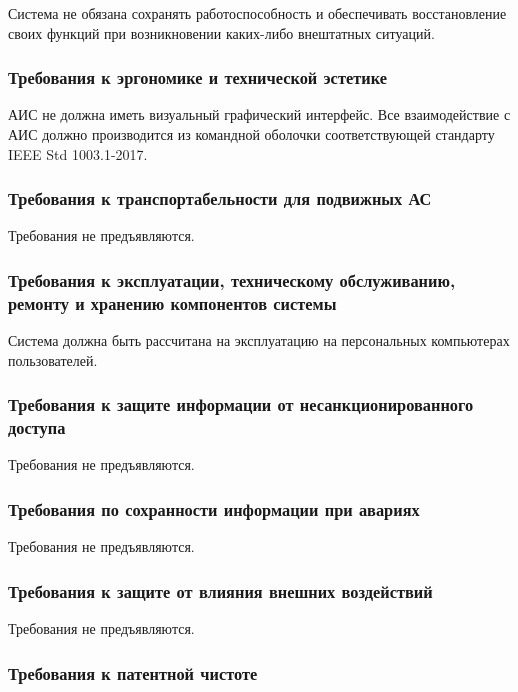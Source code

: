 \documentclass[14pt,russian]{extarticle}
\begin{document}
Система не обязана сохранять работоспособность и обеспечивать восстановление
своих функций при возникновении каких-либо внештатных ситуаций.

\subsubsection{Требования к эргономике и технической эстетике}

АИС не должна иметь визуальный графический интерфейс. Все взаимодействие с АИС должно производится из командной оболочки соответствующей стандарту IEEE Std 1003.1-2017.

\subsubsection{Требования к транспортабельности для подвижных АС}

Требования не предъявляются.

\subsubsection{Требования к эксплуатации, техническому обслуживанию,\\ремонту и
хранению компонентов системы}

Система должна быть рассчитана на эксплуатацию на персональных компьютерах пользователей.

\subsubsection{Требования к защите информации от несанкционированного\\доступа}

Требования не предъявляются.

\subsubsection{Требования по сохранности информации при авариях}

Требования не предъявляются.

\subsubsection{Требования к защите от влияния внешних воздействий}

Требования не предъявляются.

\subsubsection{Требования к патентной чистоте}
\end{document}
